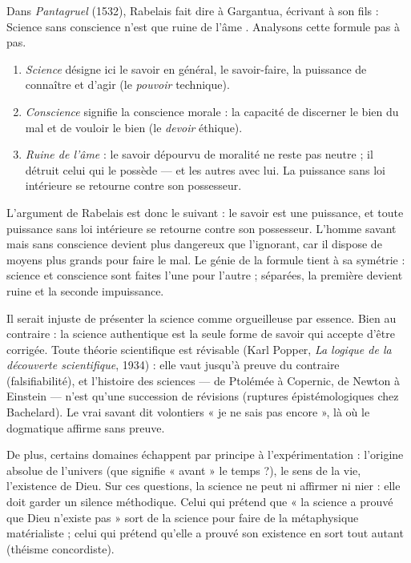 \documentclass[11pt]{article}
\newcommand{\cle}[1]{{\popxbold\color{popdark}#1}}
\newcounter{popsec}
\newcounter{popsub}
\newcommand{\courssub}[1]{%
  \stepcounter{popsub}%
  \par\vspace{9pt}\noindent{\popxbold\fontsize{11.5}{13}\selectfont\color{popink}{\color{poporange}\thepopsec.\thepopsub}\hspace{6pt}#1}\par\nopagebreak\vspace{4pt}
}
\begin{document}
\begin{experience}
Dans \emph{Pantagruel} (1532), Rabelais fait dire à Gargantua, écrivant à son fils : \guillemotleft Science sans conscience n'est que ruine de l'âme \guillemotright. Analysons cette formule pas à pas.
\begin{enumerate}
\item \emph{Science} désigne ici le savoir en général, le savoir-faire, la puissance de connaître et d'agir (le \emph{pouvoir} technique).
\item \emph{Conscience} signifie la conscience morale : la capacité de discerner le bien du mal et de vouloir le bien (le \emph{devoir} éthique).
\item \emph{Ruine de l'âme} : le savoir dépourvu de moralité ne reste pas neutre ; il détruit celui qui le possède — et les autres avec lui. La puissance sans loi intérieure se retourne contre son possesseur.
\end{enumerate}
L'argument de Rabelais est donc le suivant : le savoir est une puissance, et toute puissance sans loi intérieure se retourne contre son possesseur. L'homme savant mais sans conscience devient plus dangereux que l'ignorant, car il dispose de moyens plus grands pour faire le mal. Le génie de la formule tient à sa symétrie : science et conscience sont faites l'une pour l'autre ; séparées, la première devient ruine et la seconde impuissance.
\end{experience}

\courssub{La science elle-même reconnaît ses limites}

Il serait injuste de présenter la science comme orgueilleuse par essence. Bien au contraire : la science authentique est la seule forme de savoir qui accepte d'être corrigée. Toute théorie scientifique est \cle{révisable} (Karl Popper, \emph{La logique de la découverte scientifique}, 1934) : elle vaut jusqu'à preuve du contraire (falsifiabilité), et l'histoire des sciences — de Ptolémée à Copernic, de Newton à Einstein — n'est qu'une succession de révisions (ruptures épistémologiques chez Bachelard). Le vrai savant dit volontiers « je ne sais pas encore », là où le dogmatique affirme sans preuve.

De plus, certains domaines échappent par principe à l'expérimentation : l'origine absolue de l'univers (que signifie « avant » le temps ?), le sens de la vie, l'existence de Dieu. Sur ces questions, la science ne peut ni affirmer ni nier : elle doit garder un silence méthodique. Celui qui prétend que « la science a prouvé que Dieu n'existe pas » sort de la science pour faire de la métaphysique matérialiste ; celui qui prétend qu'elle a prouvé son existence en sort tout autant (théisme concordiste).
\end{document}
